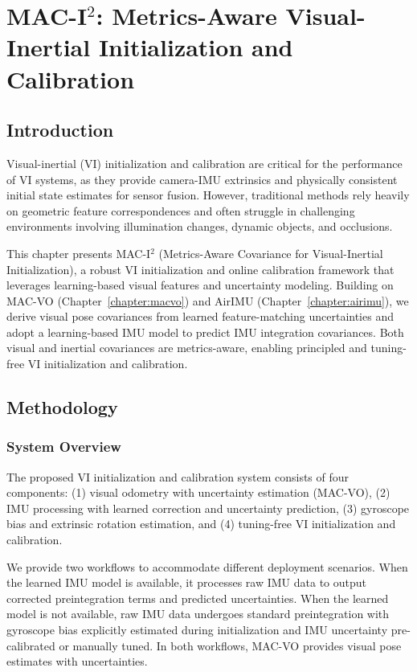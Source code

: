 \chapter{MAC-I$^2$: Metrics-Aware Visual-Inertial Initialization and Calibration} \label{chapter:macinit}

\section{Introduction}

Visual-inertial (VI) initialization and calibration are critical for the performance of VI systems, as they provide camera-IMU extrinsics and physically consistent initial state estimates for sensor fusion. However, traditional methods rely heavily on geometric feature correspondences and often struggle in challenging environments involving illumination changes, dynamic objects, and occlusions.

This chapter presents MAC-I$^2$ (Metrics-Aware Covariance for Visual-Inertial Initialization), a robust VI initialization and online calibration framework that leverages learning-based visual features and uncertainty modeling. Building on MAC-VO (Chapter~\ref{chapter:macvo}) and AirIMU (Chapter~\ref{chapter:airimu}), we derive visual pose covariances from learned feature-matching uncertainties and adopt a learning-based IMU model to predict IMU integration covariances. Both visual and inertial covariances are metrics-aware, enabling principled and tuning-free VI initialization and calibration.

\section{Methodology}

\subsection{System Overview}

The proposed VI initialization and calibration system consists of four components: (1) visual odometry with uncertainty estimation (MAC-VO), (2) IMU processing with learned correction and uncertainty prediction, (3) gyroscope bias and extrinsic rotation estimation, and (4) tuning-free VI initialization and calibration.

We provide two workflows to accommodate different deployment scenarios. When the learned IMU model is available, it processes raw IMU data to output corrected preintegration terms and predicted uncertainties. When the learned model is not available, raw IMU data undergoes standard preintegration with gyroscope bias explicitly estimated during initialization and IMU uncertainty pre-calibrated or manually tuned. In both workflows, MAC-VO provides visual pose estimates with uncertainties.


